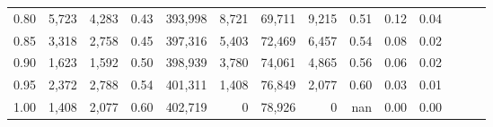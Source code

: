 \begin{tabular}{rrrrrrrrrrrrrr}
0.80 &   5,723 &   4,283 &  0.43 &  393,998 &    8,721 &  69,711 &   9,215 &  0.51 &  0.12 &      0.04 \\
0.85 &   3,318 &   2,758 &  0.45 &  397,316 &    5,403 &  72,469 &   6,457 &  0.54 &  0.08 &      0.02 \\
0.90 &   1,623 &   1,592 &  0.50 &  398,939 &    3,780 &  74,061 &   4,865 &  0.56 &  0.06 &      0.02 \\
0.95 &   2,372 &   2,788 &  0.54 &  401,311 &    1,408 &  76,849 &   2,077 &  0.60 &  0.03 &      0.01 \\
1.00 &   1,408 &   2,077 &  0.60 &  402,719 &        0 &  78,926 &       0 &   nan &  0.00 &      0.00 \\
\bottomrule
\end{tabular}
